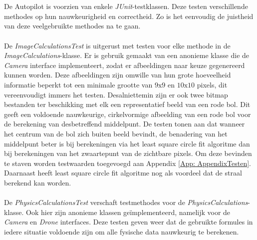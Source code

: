 \\
\\
De Autopilot is voorzien van enkele \textit{JUnit}-testklassen. Deze testen verschillende methodes op hun nauwkeurigheid en correctheid. Zo is het eenvoudig de juistheid van deze veelgebruikte methodes na te gaan.
\\
\\
De \textit{ImageCalculationsTest} is uitgerust met testen voor elke methode in de \textit{ImageCalculations}-klasse. Er is gebruik gemaakt van een anonieme klasse die de \textit{Camera} interface implementeert, zodat er afbeeldingen naar keuze gegenereerd kunnen worden. Deze afbeeldingen zijn omwille van hun grote hoeveelheid informatie beperkt tot een minimale grootte van \(9\text{x}9\) en \(10\text{x}10\) pixels, dit vereenvoudigt immers het testen. Desalniettemin zijn er ook twee bitmap bestanden ter beschikking met elk een representatief beeld van een rode bol. Dit geeft een voldoende nauwkeurige, cirkelvormige afbeelding van een rode bol voor de berekening van desbetreffend middelpunt. De testen tonen aan dat wanneer het centrum van de bol zich buiten beeld bevindt, de benadering van het middelpunt beter is bij berekeningen via het least square circle fit algoritme dan bij berekeningen van het zwaartepunt van de zichtbare pixels. Om deze bevinden te staven worden testwaarden toegevoegd aan Appendix \ref{App: AppendixTesten}. Daarnaast heeft least square circle fit algoritme nog als voordeel dat de straal berekend kan worden.
\\
\\
De \textit{PhysicsCalculationsTest} verschaft testmethodes voor de \textit{PhysicsCalculations}-klasse. Ook hier zijn anonieme klassen ge\"implementeerd, namelijk voor de \textit{Camera} en \textit{Drone} interfaces. Deze testen geven weer dat de gebruikte formules in iedere situatie voldoende zijn om alle fysische data nauwkeurig te berekenen.

